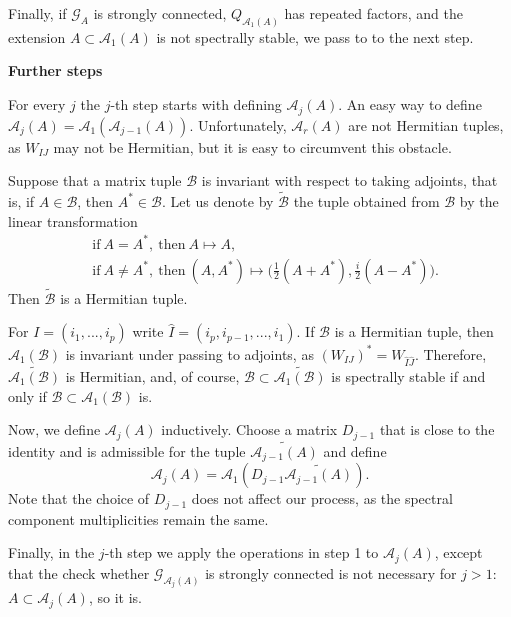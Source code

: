 \documentclass[draft, 12pt, reqno]{amsart}
\numberwithin{equation}{section}
\theoremstyle{plain}
\begin{document}
Finally, if $\mathcal{G}_A$ is strongly connected, $Q_{\mathcal{A}_1(A)}$ has repeated factors, and the extension $A\subset \mathcal{A}_1(A)$ is not spectrally stable, we pass to to the next step. 

\vspace{.2cm}
\textbf{Further steps}

\vspace{.2cm}


For every $j$ the $j$-th  step starts with defining $\mathcal{A}_j(A)$. An easy way to define $\mathcal{A}_j(A)=\mathcal{A}_1(\mathcal{A}_{j-1}(A))$. Unfortunately, $\mathcal{A}_r(A)$ are not Hermitian tuples, as $W_{IJ}$ may not be Hermitian, but it is easy to circumvent this obstacle. 

Suppose that a matrix tuple $\mathcal{B}$ is invariant with respect to taking adjoints, that is, if 
$A\in \mathcal{B}$, then $A^*\in \mathcal{B}$. Let us denote by $\widetilde{\mathcal{B}}$ the tuple obtained from $\mathcal{B}$ by the linear transformation
\begin{eqnarray*} 
&\mbox{if} \ A=A^*, \ \mbox{then} \ A\mapsto A, \\
&\mbox{if} \ A\neq A^*, \ \mbox{then} \ (A,A^*)\mapsto \big(\frac{1}{2}(A+A^*), \frac{i}{2}(A-A^*)\big).
\end{eqnarray*}
Then $\widetilde{\mathcal{B}}$ is a Hermitian tuple.

For $I=(i_1,...,i_p)$ write $\widehat{I}=(i_p,i_{p-1},...,i_1)$. If $\mathcal{B}$ is a Hermitian tuple, then  $\mathcal{A}_1(\mathcal{B})$ is invariant under passing to adjoints, as 
  $(W_{IJ})^*=W_{\widehat{I} \widehat{J}}$. Therefore, $\widetilde{\mathcal{A}_1(\mathcal{B})}$ is Hermitian, 
 and, of course, $\mathcal{B}\subset \widetilde{\mathcal{A}_1(\mathcal{B})}$ is spectrally stable if and only if $\mathcal{B} \subset \mathcal{A}_1(\mathcal{B})$ is.
  
  
Now, we define $\mathcal{A}_j(A)$ inductively. Choose a matrix $D_{j-1}$ that is close to the identity and is admissible for the tuple $\widetilde{\mathcal{A}_{j-1}(A)}$ and define
$$ \mathcal{A}_j(A)=\mathcal{A}_1(D_{j-1} \widetilde{\mathcal{A}_{j-1}(A)}).$$
\noindent Note that the choice of $D_{j-1}$ does not affect our process, as the spectral component multiplicities remain the same.

Finally, in the $j$-th step we apply the operations in step 1 to $\mathcal{A}_j(A)$, except that the check whether $\mathcal{G}_{\mathcal{A}_j(A)}$ is strongly connected is not necessary for $j>1$: $A\subset \mathcal{A}_j(A)$, so it is.
\end{document}
